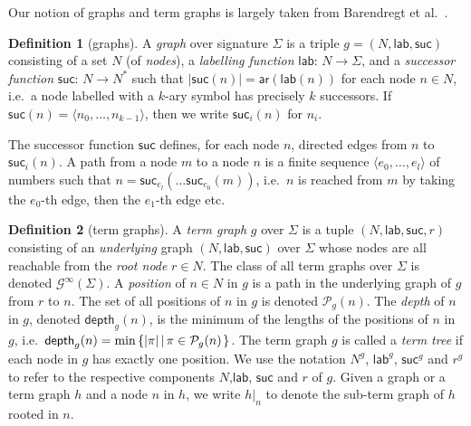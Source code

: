 \documentclass[copyright,creativecommons,UKenglish,final]{eptcs}
\newcommand\calG{\mathcal{G}}
\newcommand\calP{\mathcal{P}}
\newcommand\calPos{\calP}
\newcommand\fcolon{\colon\,}
\newcommand\funto{\rightarrow}
\newcommand\len[1]{\left\lvert #1 \right\rvert}
\newcommand\seq[1]{\langle #1 \rangle}
\newcommand\srank[1]{\symb{ar}(#1)}
\newcommand{\setcom}[2]{\set{#1\left\vert\vphantom{#1}\,#2\right.}}
\newcommand{\set}[1]{\left\{#1\right\}}
\newcommand\nodePos[2]{\calPos_{#1}(#2)}
\newcommand\depth[2]{\symb{depth}_{#1}(#2)}
\newcommand\itgraphs[1][\Sigma]{\calG^\infty(#1)}
\newcommand\symb[1]{\mathsf{#1}}
\newcommand\glab{\symb{lab}}
\newcommand\gsuc{\symb{suc}}
\newcommand\subgraph[2]{#1|_{#2}}
\theoremstyle{definition}
\newtheorem{definition}{Definition}[section]
\theoremstyle{plain}
\begin{document}
Our notion of graphs and term graphs is largely taken from Barendregt et
al.~\cite{barendregt87parle}.
\begin{definition}[graphs]
  \label{def:graph}
A \emph{graph} over signature $\Sigma$ is a triple $g =
  (N,\glab,\gsuc)$ consisting of a set $N$ (of \emph{nodes}), a
  \emph{labelling function} $\glab\fcolon N \funto \Sigma$, and a
  \emph{successor function} $\gsuc\fcolon N \funto N^*$ such that
  $\len{\gsuc(n)} = \srank{\glab(n)}$ for each node $n\in N$, i.e.\ a
  node labelled with a $k$-ary symbol has precisely $k$ successors. If
  $\gsuc(n) = \seq{n_0,\dots,n_{k-1}}$, then we write $\gsuc_{i}(n)$
  for $n_i$.
\end{definition}
The successor function $\gsuc$ defines, for each node $n$, directed
edges from $n$ to $\gsuc_i(n)$.  A path from a node $m$ to a node $n$
is a finite sequence $\seq{e_0,\dots,e_l}$ of numbers such that
$n=\gsuc_{e_l}(\dots \gsuc_{e_0}(m))$, i.e.\ $n$ is reached from $m$
by taking the $e_0$-th edge, then the $e_1$-th edge etc.

\begin{definition}[term graphs]
  \label{def:tgraph}
A \emph{term graph} $g$ over $\Sigma$ is a tuple $(N,\glab,\gsuc,r)$
  consisting of an \emph{underlying} graph $(N,\glab,\gsuc)$ over
  $\Sigma$ whose nodes are all reachable from the \emph{root node}
  $r\in N$. The class of all term graphs over $\Sigma$ is denoted
  $\itgraphs$. A \emph{position} of $n \in N$ in $g$ is a path in the
  underlying graph of $g$ from $r$ to $n$. The set of all positions of
  $n$ in $g$ is denoted $\nodePos{g}{n}$. The \emph{depth} of $n$ in
  $g$, denoted $\depth{g}{n}$, is the minimum of the lengths of the
  positions of $n$ in $g$, i.e.\ $\depth{g}{n} = \min
  \setcom{\len{\pi}}{\pi \in \nodePos{g}{n}}$. The term graph $g$ is
  called a \emph{term tree} if each node in $g$ has exactly one
  position. We use the notation $N^{g}$, $\glab^{g}$, $\gsuc^{g}$ and
  $r^{g}$ to refer to the respective components $N$,$\glab$, $\gsuc$
  and $r$ of $g$. Given a graph or a term graph $h$ and a node $n$ in
  $h$, we write $\subgraph{h}{n}$ to denote the sub-term graph of $h$
  rooted in $n$.
\end{definition}
\end{document}

